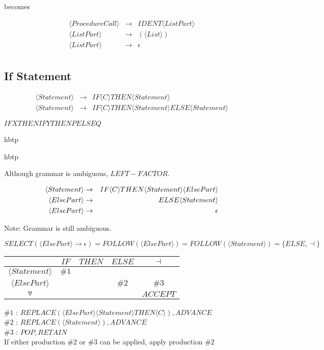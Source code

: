 \documentclass[a4paper,12pt]{article}
\newcommand{\nonterminal}[1]{\langle #1 \rangle}
\begin{document}
becomes

\begin{eqnarray*}
\nonterminal{Procedure Call}	&	\to	&	IDENT \nonterminal{List Part}	\\
\nonterminal{List Part}			&	\to	&	(\nonterminal{List})				\\
\nonterminal{List Part}			&	\to	&	\epsilon								\\
\end{eqnarray*}

\subsection*{If Statement}

\begin{eqnarray*}
\nonterminal{Statement}	&	\to	&	IF \nonterminal{C} THEN \nonterminal{Statement}		\\
\nonterminal{Statement}	&	\to	&	IF \nonterminal{C} THEN \nonterminal{Statement}	ELSE \nonterminal{Statement}
\end{eqnarray*}

$IF X THEN IF Y THEN P ELSE Q$

\begin{table}{hbtp}


\end{table}

\begin{table}{hbtp}


\end{table}

Although grammar is ambiguous, $LEFT-FACTOR$.

\begin{eqnarray}
\setcounter{equation}{1}
\nonterminal{Statement}	&	\to	&	IF \nonterminal{C} THEN \nonterminal{Statement} \nonterminal{Else Part}	\\
\nonterminal{Else Part}	&	\to	&	ELSE \nonterminal{Statement}															\\
\nonterminal{Else Part}	&	\to	&	\epsilon	 
\end{eqnarray}

Note: Grammar is still ambiguous.

$SELECT(\nonterminal{Else Part} \to \epsilon) = FOLLOW(\nonterminal{Else Part}) = FOLLOW(\nonterminal{Statement}) = \{ ELSE, \dashv \}$

\begin{tabular}{|c|c|c|c|c|}
\hline
									&	$IF$	&	$THEN$	&	$ELSE$	&	$\dashv$	\\
\hline
$\nonterminal{Statement}$	&	$\#1$	&				&				&				\\
\hline
$\nonterminal{Else Part}$	&			&				&	$\#2$		&	$\#3$		\\
\hline
$\triangledown$				&			&				&				&	$ACCEPT$	\\
\hline
\end{tabular}

$\#1$ : $REPLACE(\nonterminal{Else Part} \nonterminal{Statement} THEN \nonterminal{C}),ADVANCE$ \\
$\#2$ : $REPLACE(\nonterminal{Statement}),ADVANCE$ \\
$\#3$ : $POP,RETAIN$ \\

If either production $\#2$ or $\#3$ can be applied, apply production $\#2$ 
\end{document}

